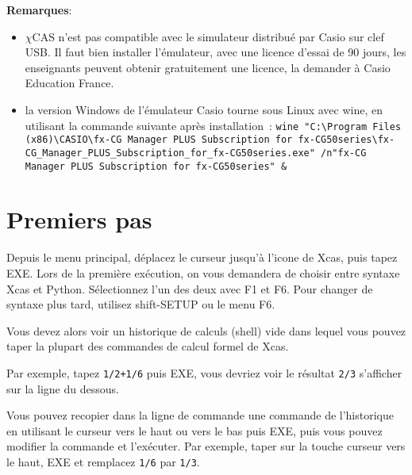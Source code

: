 \documentclass{article}
\begin{document}
\begin{giacjshere}
{\bf Remarques}:
\begin{itemize}
\item $\chi$CAS n'est pas compatible avec le simulateur distribu\'e
par Casio sur clef USB. Il faut bien installer l'\'emulateur, avec une
licence d'essai de 90 jours, les enseignants peuvent obtenir gratuitement
une licence, la demander \`a Casio Education France.
\item la version Windows de l'\'emulateur Casio tourne sous Linux avec
  wine, en utilisant la commande suivante apr\`es installation~:
\verb|wine "C:\Program Files (x86)\CASIO\fx-CG Manager PLUS Subscription for fx-CG50series\fx-CG_Manager_PLUS_Subscription_for_fx-CG50series.exe" /n"fx-CG Manager PLUS Subscription for fx-CG50series" &|
\end{itemize}

\section{Premiers pas} \label{sec:1erpas}
Depuis le menu principal, d\'eplacez le curseur jusqu'\`a l'icone de Xcas,
puis tapez EXE. Lors de la premi\`ere ex\'ecution, on vous demandera de choisir
entre syntaxe Xcas et Python. S\'electionnez l'un des deux avec
F1 et F6. Pour changer de syntaxe plus tard, utilisez shift-SETUP ou
le menu F6.


Vous devez alors voir un historique de calculs (shell) vide 
dans lequel vous pouvez
taper la plupart des commandes de calcul formel de Xcas.

Par exemple, tapez 
\verb|1/2+1/6|
puis EXE, vous devriez voir le r\'esultat \verb|2/3| s'afficher
sur la ligne du dessous.

Vous pouvez recopier dans la ligne de commande
une commande de l'historique en utilisant le
curseur vers le haut ou vers le bas puis EXE, puis vous pouvez
modifier la commande et l'ex\'ecuter. Par exemple, taper sur la
touche curseur vers le haut, EXE et remplacez \verb|1/6| par \verb|1/3|.


\end{giacjshere}
\end{document}
